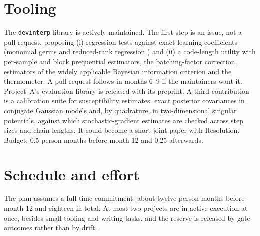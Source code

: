 \documentclass[11pt,a4paper]{article}
\begin{document}
\section{Tooling}
\label{sec:tools}

The \texttt{devinterp} library is actively maintained. The first step is
an issue, not a pull request, proposing (i) regression tests against
exact learning coefficients (monomial germs and reduced-rank regression
\cite{aoyagiwatanabe2005}) and (ii) a code-length utility with per-sample and block prequential estimators, the batching-factor correction, estimators of the widely applicable Bayesian information criterion \cite{watanabe2013} and the thermometer. A pull request
follows in months 6--9 if the maintainers want it. Project~A's evaluation library is released with its preprint. A third contribution is a calibration suite for susceptibility estimates: exact posterior covariances in conjugate Gaussian models and, by quadrature, in two-dimensional singular potentials, against which stochastic-gradient estimates are checked across step sizes and chain lengths. It could become a short joint paper with Resolution. Budget: 0.5 person-months before month 12 and 0.25 afterwards.

\section{Schedule and effort}
\label{sec:schedule}

The plan assumes a full-time commitment: about twelve person-months before
month 12 and eighteen in total. At most two projects are in active
execution at once, besides small tooling and writing tasks, and the
reserve is released by gate outcomes rather than by drift.
\end{document}
